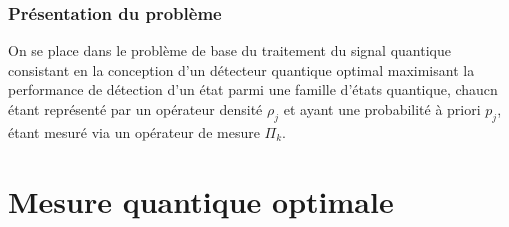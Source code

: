 \documentclass{beamer}
\begin{document}
\begin{frame}
    \frametitle{Présentation du problème}
    \begin{block}{}
        On se place dans le problème de base du traitement du signal quantique consistant en la conception d'un détecteur quantique optimal maximisant la performance de détection d'un état parmi une famille d'états quantique, chaucn étant représenté par un opérateur densité $\rho_j$ et ayant une probabilité à priori $p_j$, étant mesuré via un opérateur de mesure $\Pi_k$.

    \end{block}
\end{frame}

\section[Mesure quantique]{Mesure quantique optimale}
\end{document}
